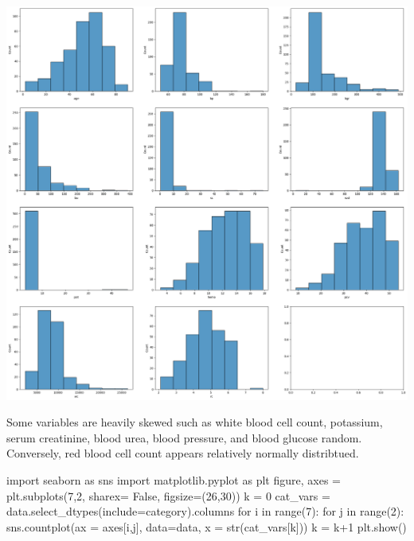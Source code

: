 \documentclass[
  11pt,
  letterpaper,
  DIV=11,
  numbers=noendperiod]{scrartcl}
\newenvironment{Shaded}{\begin{snugshade}}{\end{snugshade}}
\newcommand{\BuiltInTok}[1]{\textcolor[rgb]{0.00,0.23,0.31}{#1}}
\newcommand{\ControlFlowTok}[1]{\textcolor[rgb]{0.00,0.23,0.31}{#1}}
\newcommand{\DecValTok}[1]{\textcolor[rgb]{0.68,0.00,0.00}{#1}}
\newcommand{\ImportTok}[1]{\textcolor[rgb]{0.00,0.46,0.62}{#1}}
\newcommand{\KeywordTok}[1]{\textcolor[rgb]{0.00,0.23,0.31}{#1}}
\newcommand{\NormalTok}[1]{\textcolor[rgb]{0.00,0.23,0.31}{#1}}
\newcommand{\OperatorTok}[1]{\textcolor[rgb]{0.37,0.37,0.37}{#1}}
\newcommand{\StringTok}[1]{\textcolor[rgb]{0.13,0.47,0.30}{#1}}
\newcommand{\VariableTok}[1]{\textcolor[rgb]{0.07,0.07,0.07}{#1}}
\begin{document}
\includegraphics{Seebach_Lily_HW6_files/figure-pdf/cell-10-output-1.png}

Some variables are heavily skewed such as white blood cell count,
potassium, serum creatinine, blood urea, blood pressure, and blood
glucose random. Conversely, red blood cell count appears relatively
normally distribtued.

\begin{Shaded}
\begin{Highlighting}[]
\ImportTok{import}\NormalTok{ seaborn }\ImportTok{as}\NormalTok{ sns}
\ImportTok{import}\NormalTok{ matplotlib.pyplot }\ImportTok{as}\NormalTok{ plt}
\NormalTok{figure, axes }\OperatorTok{=}\NormalTok{ plt.subplots(}\DecValTok{7}\NormalTok{,}\DecValTok{2}\NormalTok{, sharex}\OperatorTok{=} \VariableTok{False}\NormalTok{, figsize}\OperatorTok{=}\NormalTok{(}\DecValTok{26}\NormalTok{,}\DecValTok{30}\NormalTok{))}
\NormalTok{k }\OperatorTok{=} \DecValTok{0}
\NormalTok{cat\_vars }\OperatorTok{=}\NormalTok{  data.select\_dtypes(include}\OperatorTok{=}\StringTok{\textquotesingle{}category\textquotesingle{}}\NormalTok{).columns}
\ControlFlowTok{for}\NormalTok{ i }\KeywordTok{in} \BuiltInTok{range}\NormalTok{(}\DecValTok{7}\NormalTok{):}
    \ControlFlowTok{for}\NormalTok{ j }\KeywordTok{in} \BuiltInTok{range}\NormalTok{(}\DecValTok{2}\NormalTok{):}
\NormalTok{        sns.countplot(ax }\OperatorTok{=}\NormalTok{ axes[i,j], data}\OperatorTok{=}\NormalTok{data, x }\OperatorTok{=} \BuiltInTok{str}\NormalTok{(cat\_vars[k]))}
\NormalTok{        k }\OperatorTok{=}\NormalTok{ k}\OperatorTok{+}\DecValTok{1}
\NormalTok{plt.show()}
\end{Highlighting}
\end{Shaded}
\end{document}
